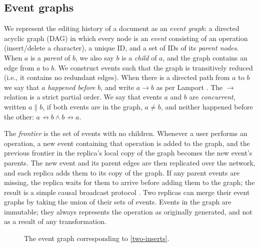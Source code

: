 \documentclass[sigplan,10pt]{acmart}
\begin{document}
\subsection{Event graphs}\label{event-graphs}

We represent the editing history of a document as an \emph{event graph}: a directed acyclic graph (DAG) in which every node is an \emph{event} consisting of an operation (insert/delete a character), a unique ID, and a set of IDs of its \emph{parent nodes}.
When $a$ is a \emph{parent} of $b$, we also say $b$ is a \emph{child} of $a$, and the graph contains an edge from $a$ to $b$.
We construct events such that the graph is transitively reduced (i.e., it contains no redundant edges).
When there is a directed path from $a$ to $b$ we say that $a$ \emph{happened before} $b$, and write $a \rightarrow b$ as per Lamport \cite{Lamport1978}.
The $\rightarrow$ relation is a strict partial order.
We say that events $a$ and $b$ are \emph{concurrent}, written $a \parallel b$, if both events are in the graph, $a \neq b$, and neither happened before the other: $a \not\rightarrow b \wedge b \not\rightarrow a$.

The \emph{frontier} is the set of events with no children.
Whenever a user performs an operation, a new event containing that operation is added to the graph, and the previous frontier in the replica's local copy of the graph becomes the new event's parents.
The new event and its parent edges are then replicated over the network, and each replica adds them to its copy of the graph.
If any parent events are missing, the replica waits for them to arrive before adding them to the graph; the result is a simple causal broadcast protocol \cite{Birman1991,Cachin2011}.
Two replicas can merge their event graphs by taking the union of their sets of events.
Events in the graph are immutable; they always represents the operation as originally generated, and not as a result of any transformation.

\begin{figure}
  \caption{The event graph corresponding to \autoref{two-inserts}.}
  \label{graph-example}
\end{figure}
\end{document}
